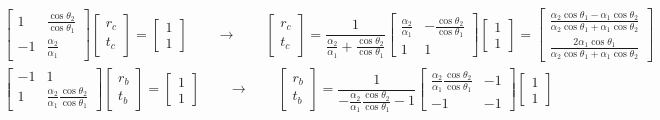 \documentclass[letterpaper,10pt,italian]{jupyterBook}
\begin{document}
\begin{equation*}
\begin{split}
\begin{bmatrix} 1 & \frac{\cos \theta_2}{\cos \theta_1} \\ -1 & \frac{\alpha_2}{\alpha_1} \end{bmatrix}
 \begin{bmatrix} r_c \\ t_c \end{bmatrix} = \begin{bmatrix} 1 \\ 1 \end{bmatrix}
\qquad \rightarrow \qquad
\begin{bmatrix} r_c \\ t_c \end{bmatrix} = \dfrac{1}{\frac{\alpha_2}{\alpha_1} + \frac{\cos \theta_2}{\cos \theta_1}} \begin{bmatrix} \frac{\alpha_2}{\alpha_1} & - \frac{\cos \theta_2}{\cos \theta_1} \\ 1 & 1  \end{bmatrix} \begin{bmatrix} 1 \\ 1 \end{bmatrix} 
= \begin{bmatrix} \frac{\alpha_2 \cos \theta_1 - \alpha_1 \cos \theta_2}{\alpha_2 \cos \theta_1 + \alpha_1 \cos \theta_2} \\ \frac{2 \alpha_1 \cos \theta_1}{\alpha_2 \cos \theta_1 + \alpha_1 \cos \theta_2} \end{bmatrix}
\end{split}
\end{equation*}\begin{equation*}
\begin{split}
\begin{bmatrix} -1 & 1 \\ 1 & \frac{\alpha_2}{\alpha_1} \frac{\cos \theta_2}{\cos \theta_1} \end{bmatrix}
 \begin{bmatrix} r_b \\ t_b \end{bmatrix} = \begin{bmatrix} 1 \\ 1 \end{bmatrix}
\qquad \rightarrow \qquad
\begin{bmatrix} r_b \\ t_b \end{bmatrix} = \dfrac{1}{-\frac{\alpha_2}{\alpha_1} \frac{\cos \theta_2}{\cos \theta_1} - 1} \begin{bmatrix}  \frac{\alpha_2}{\alpha_1} \frac{\cos \theta_2}{\cos \theta_1} & -1 \\ -1 & -1  \end{bmatrix} \begin{bmatrix} 1 \\ 1 \end{bmatrix} 

\end{split}
\end{equation*}
\end{document}
